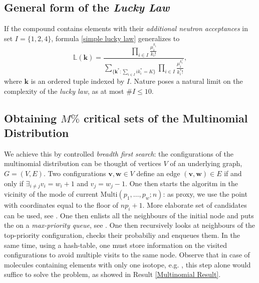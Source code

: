 \subsection*{General form of the \emph{Lucky Law}}

If the compound contains elements with their {\it additional neutron acceptances} in set $I = \{ 1, 2, 4\}$, formula \eqref{simple lucky law} generalizes to 
\begin{equation*}
	\mathbb{L}( \bm{k} ) = 
	\frac{ 
		\prod_{i \in I} \frac{ \mu_i^{k_i} }{ {k_i}! } 
	}{ 
		\underset{ \{ \bm{k}^* :  \sum_{i \in I} i k_i^*  = K \} }{\sum} 	
		\prod_{i \in I} \frac{ \mu_i^{k_i^*} }{ {k_i^*}! }	
	},
\end{equation*}
where $\bm{k}$ is an ordered tuple indexed by $I$. Nature poses a natural limit on the complexity of the {\it lucky law}, as at most  $\# I \leq 10$.


\subsection*{Obtaining $M\%$ critical sets of the Multinomial Distribution}

We achieve this by controlled {\it breadth first search}: the configurations of the multinomial distribution can be thought of vertices $V$ of an underlying graph, $G = (V,E)$. Two configurations $\bm{v}, \bm{w} \in V$ define an edge $(\bm{v}, \bm{w}) \in E$ if and only if $\exists_{i \not= j} v_i = w_i + 1$ and $v_j = w_j - 1$. One then starts the algoritm in the vicinity of the mode of current $\mathrm{Multi}\left( p_1, \dots, p_w; n \right)$: as proxy, we use the point with coordinates equal to the floor of $n p_i + 1$. More elaborate set of candidates can be used, see \cite{Gall2003DeterminationOfTheModesOfMultinomial}. One then enlists all the neighbours of the initial node and puts the on a {\it max-priority queue}, see \cite{Cormen2001IntroductionToAlgorithms}. One then recursively looks at neighbours of the top-priority configuration, checks their probabiliy and enqueues them. In the same time, using a hash-table, one must store information on the visited configurations to avoid multiple visits to the same node. Observe that in case of molecules containing elements with only one isotope, e.g. \smallMolecule, this step alone would suffice to solve the problem, as showed in Result \ref{Multinomial Result}.